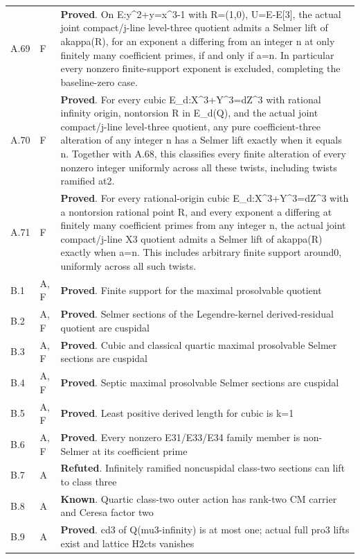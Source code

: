 \begin{longtable}{@{}p{}p{}p{}@{}}
A.69 & F & \textbf{Proved}. On E:y\textasciicircum{}2+y=x\textasciicircum{}3-1 with R=(1,0), U=E-E[3], the actual joint compact/j-line level-three quotient admits a Selmer lift of akappa(R), for an exponent a differing from an integer n at only finitely many coefficient primes, if and only if a=n. In particular every nonzero finite-support exponent is excluded, completing the baseline-zero case. \\
A.70 & F & \textbf{Proved}. For every cubic E\_d:X\textasciicircum{}3+Y\textasciicircum{}3=dZ\textasciicircum{}3 with rational infinity origin, nontorsion R in E\_d(Q), and the actual joint compact/j-line level-three quotient, any pure coefficient-three alteration of any integer n has a Selmer lift exactly when it equals n. Together with A.68, this classifies every finite alteration of every nonzero integer uniformly across all these twists, including twists ramified at2. \\
A.71 & F & \textbf{Proved}. For every rational-origin cubic E\_d:X\textasciicircum{}3+Y\textasciicircum{}3=dZ\textasciicircum{}3 with a nontorsion rational point R, and every exponent a differing at finitely many coefficient primes from any integer n, the actual joint compact/j-line X3 quotient admits a Selmer lift of akappa(R) exactly when a=n. This includes arbitrary finite support around0, uniformly across all such twists. \\
B.1 & A, F & \textbf{Proved}. Finite support for the maximal prosolvable quotient \\
B.2 & A, F & \textbf{Proved}. Selmer sections of the Legendre-kernel derived-residual quotient are cuspidal \\
B.3 & A, F & \textbf{Proved}. Cubic and classical quartic maximal prosolvable Selmer sections are cuspidal \\
B.4 & A, F & \textbf{Proved}. Septic maximal prosolvable Selmer sections are cuspidal \\
B.5 & A, F & \textbf{Proved}. Least positive derived length for cubic is k=1 \\
B.6 & A, F & \textbf{Proved}. Every nonzero E31/E33/E34 family member is non-Selmer at its coefficient prime \\
B.7 & A & \textbf{Refuted}. Infinitely ramified noncuspidal class-two sections can lift to class three \\
B.8 & A & \textbf{Known}. Quartic class-two outer action has rank-two CM carrier and Ceresa factor two \\
B.9 & A & \textbf{Proved}. cd3 of Q(mu3-infinity) is at most one; actual full pro3 lifts exist and lattice H2cts vanishes \\

\end{longtable}

